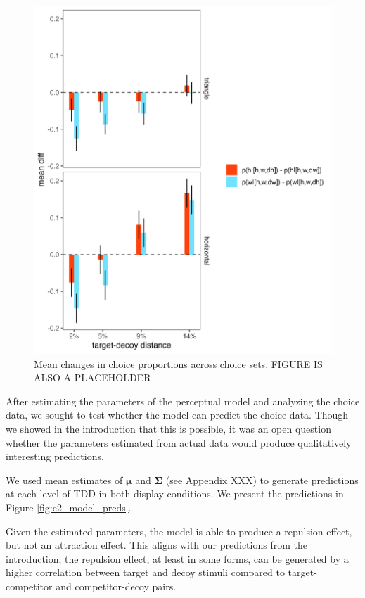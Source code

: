 \documentclass{umassthesis}          %
\begin{document}
\begin{figure}
   \includegraphics[width=\textwidth]{figures/choicePhase_delta_means.jpeg}
   \caption{Mean changes in choice proportions across choice sets. FIGURE IS ALSO A PLACEHOLDER}
   \label{e2_choicedeltas}
\end{figure}

After estimating the parameters of the perceptual model and analyzing the choice data, we sought to test whether the model can predict the choice data. Though we showed in the introduction that this is possible, it was an open question whether the parameters estimated from actual data would produce qualitatively interesting predictions.

We used mean estimates of $\mathbf{\mu}$ and $\mathbf{\Sigma}$ (see Appendix XXX) to generate predictions at each level of TDD in both display conditions. We present the predictions in Figure \ref{fig:e2_model_preds}. 

Given the estimated parameters, the model is able to produce a repulsion effect, but not an attraction effect. This aligns with our predictions from the introduction; the repulsion effect, at least in some forms, can be generated by a higher correlation between target and decoy stimuli compared to target-competitor and competitor-decoy pairs.
\end{document}
